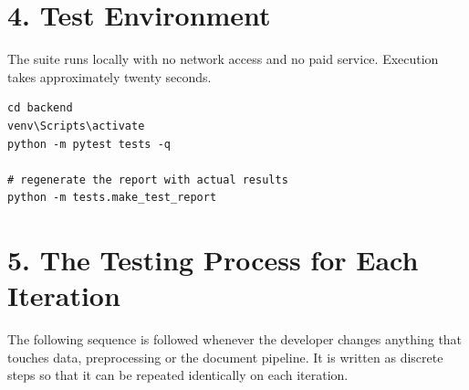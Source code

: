 \documentclass[11pt,a4paper]{article}
\begin{document}
\section{4. Test Environment}
The suite runs locally with no network access and no paid service. Execution takes approximately twenty seconds.

\begin{verbatim}
cd backend
venv\Scripts\activate
python -m pytest tests -q

# regenerate the report with actual results
python -m tests.make_test_report
\end{verbatim}

\section{5. The Testing Process for Each Iteration}
The following sequence is followed whenever the developer changes anything that touches data, preprocessing or the document pipeline. It is written as discrete steps so that it can be repeated identically on each iteration.
\end{document}
